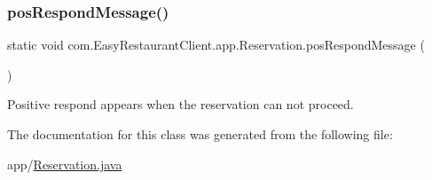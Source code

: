 \subsubsection{\texorpdfstring{posRespondMessage()}{posRespondMessage()}}
{\footnotesize\ttfamily static void com.\+Easy\+Restaurant\+Client.\+app.\+Reservation.\+pos\+Respond\+Message (\begin{DoxyParamCaption}{ }\end{DoxyParamCaption})\hspace{0.3cm}{\ttfamily [static]}}



Positive respond appears when the reservation can not proceed. 



The documentation for this class was generated from the following file\+:\begin{DoxyCompactItemize}
\item 
app/\mbox{\hyperlink{_reservation_8java}{Reservation.\+java}}\end{DoxyCompactItemize}
